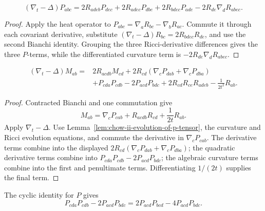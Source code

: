 \begin{lemma}
\label{lem:chow-ii-evolution-of-p-tensor}
\[
(\nabla_t-\Delta)P_{abc}=2R_{adeb}P_{dec}+2R_{adec}P_{dbe}
+2R_{bdec}P_{ade}-2R_{de}\nabla_dR_{abec}.
\]
\end{lemma}
\begin{proof}
Apply the heat operator to
\(P_{abc}=\nabla_aR_{bc}-\nabla_bR_{ac}\).  Commute it through each
covariant derivative, substitute
\((\nabla_t-\Delta)R_{bc}=2R_{bdec}R_{de}\), and use the second Bianchi
identity.  Grouping the three Ricci-derivative differences gives the three
\(P\)-terms, while the differentiated curvature term is
\(-2R_{de}\nabla_dR_{abec}\).
\end{proof}

\begin{lemma}
\label{lem:chow-ii-evolution-of-m-tensor}
\[
\begin{aligned}
(\nabla_t-\Delta)M_{ab}={}&2R_{acdb}M_{cd}
+2R_{cd}(\nabla_cP_{dab}+\nabla_cP_{dba})\\
&+P_{cda}P_{cdb}-2P_{acd}P_{bdc}
+2R_{cd}R_{ce}R_{adeb}-\frac1{2t^2}R_{ab}.
\end{aligned}
\]
\end{lemma}
\begin{proof}
Contracted Bianchi and one commutation give
\[
M_{ab}=\nabla_cP_{cab}+R_{acdb}R_{cd}+\frac1{2t}R_{ab}.
\]
Apply \(\nabla_t-\Delta\).  Use Lemma~\ref{lem:chow-ii-evolution-of-p-tensor},
the curvature and Ricci evolution equations, and commute the derivative in
\(\nabla_cP_{cab}\).  The derivative terms combine into the displayed
\(2R_{cd}(\nabla_cP_{dab}+\nabla_cP_{dba})\); the quadratic derivative terms
combine into \(P_{cda}P_{cdb}-2P_{acd}P_{bdc}\); the algebraic curvature
terms combine into the first and penultimate terms.  Differentiating
\(1/(2t)\) supplies the final term.
\end{proof}

\begin{remark}
\label{rem:chow-ii-m-evolution-equivalent-p-terms}
The cyclic identity for \(P\) gives
\[
P_{cda}P_{cdb}-2P_{acd}P_{bdc}
=2P_{acd}P_{bcd}-4P_{acd}P_{bdc}.
\]
\end{remark}

